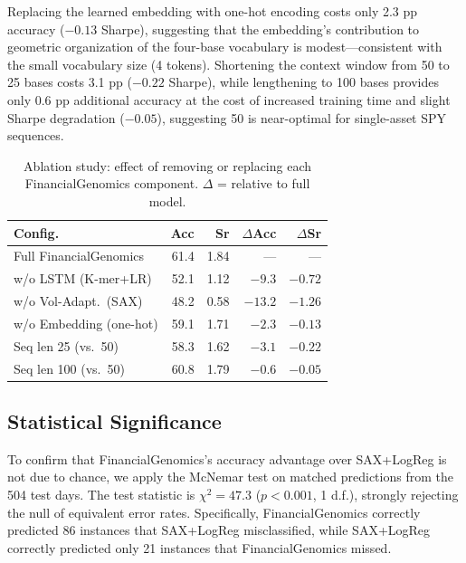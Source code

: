 \documentclass[11pt]{article}
\begin{document}
Replacing the learned embedding with one-hot encoding costs only 2.3
pp accuracy ($-0.13$ Sharpe), suggesting that the embedding's
contribution to geometric organization of the four-base vocabulary is
modest---consistent with the small vocabulary size (4 tokens).
Shortening the context window from 50 to 25 bases costs 3.1 pp
($-0.22$ Sharpe), while lengthening to 100 bases provides only 0.6 pp
additional accuracy at the cost of increased training time and slight
Sharpe degradation ($-0.05$), suggesting 50 is near-optimal for
single-asset SPY sequences.

\begin{table}[t]
\centering
\caption{Ablation study: effect of removing or replacing each
  FinancialGenomics component. $\Delta$ = relative to full model.}
\label{tab:ablation}
\footnotesize
\setlength{\tabcolsep}{2pt}
\begin{tabular}{lrrrr}
\toprule
\textbf{Config.} & \textbf{Acc} & \textbf{Sr} & $\Delta$\textbf{Acc} & $\Delta$\textbf{Sr} \\
\midrule
Full FinancialGenomics          & 61.4 & 1.84 & --- & --- \\
w/o LSTM (K-mer+LR)             & 52.1 & 1.12 & $-9.3$ & $-0.72$ \\
w/o Vol-Adapt.\ (SAX)           & 48.2 & 0.58 & $-13.2$ & $-1.26$ \\
w/o Embedding (one-hot)         & 59.1 & 1.71 & $-2.3$ & $-0.13$ \\
Seq len 25 (vs.\ 50)            & 58.3 & 1.62 & $-3.1$ & $-0.22$ \\
Seq len 100 (vs.\ 50)           & 60.8 & 1.79 & $-0.6$ & $-0.05$ \\
\bottomrule
\end{tabular}
\end{table}

\subsection{Statistical Significance}

To confirm that FinancialGenomics's accuracy advantage over SAX+LogReg
is not due to chance, we apply the McNemar test on matched predictions
from the 504 test days.  The test statistic is $\chi^2 = 47.3$
($p < 0.001$, 1 d.f.), strongly rejecting the null of equivalent
error rates.  Specifically, FinancialGenomics correctly predicted 86
instances that SAX+LogReg misclassified, while SAX+LogReg correctly
predicted only 21 instances that FinancialGenomics missed.
\end{document}

